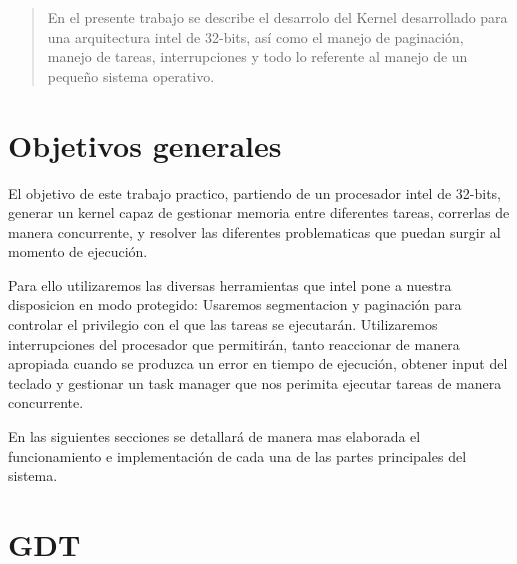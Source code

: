 \documentclass[a4paper]{article}
\begin{document}
\thispagestyle{empty}

\maketitle
\newpage

\thispagestyle{empty}
\vfill
\begin{abstract}
En el presente trabajo se describe el desarrolo del Kernel desarrollado para una arquitectura intel de 32-bits, así como el manejo de paginación, manejo de tareas, interrupciones y todo lo referente al manejo de un pequeño sistema operativo.

\end{abstract}

\thispagestyle{empty}
\vspace{3cm}
\tableofcontents
\newpage

\newpage

\section{Objetivos generales}

El objetivo de este trabajo practico, partiendo de un procesador intel de 32-bits, generar un kernel capaz de gestionar memoria entre diferentes tareas, correrlas de manera concurrente, y resolver las diferentes problematicas que puedan surgir al momento de ejecución.

Para ello utilizaremos las diversas herramientas que intel pone a nuestra disposicion en modo protegido: Usaremos segmentacion y paginación para controlar el privilegio con el que las tareas se ejecutarán.
Utilizaremos interrupciones del procesador que permitirán, tanto reaccionar de manera apropiada cuando se produzca un error en tiempo de ejecución, obtener input del teclado y gestionar un task manager que nos perimita ejecutar tareas de manera concurrente.

En las siguientes secciones se detallará de manera mas elaborada el funcionamiento e implementación de cada una de las partes principales del sistema.

\clearpage

\section{GDT}

\end{document}
